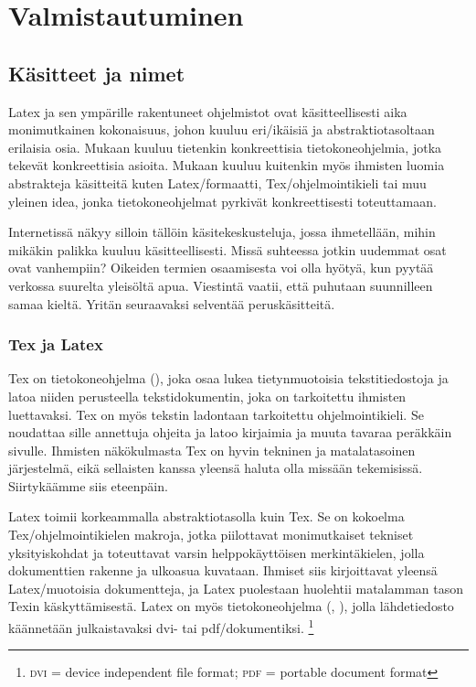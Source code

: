 
\chapter{Valmistautuminen}

\section{Käsitteet ja nimet}

Latex ja sen ympärille rakentuneet ohjelmistot ovat käsitteellisesti
aika monimutkainen kokonaisuus, johon kuuluu eri\-/ikäisiä ja
abstraktiotasoltaan erilaisia osia. Mukaan kuuluu tietenkin
konkreettisia tietokoneohjelmia, jotka tekevät konkreettisia asioita.
Mukaan kuuluu kuitenkin myös ihmisten luomia abstrakteja käsitteitä
kuten Latex\-/formaatti, Tex\-/ohjelmointikieli tai muu yleinen idea,
jonka tietokoneohjelmat pyrkivät konkreettisesti toteuttamaan.

Internetissä näkyy silloin tällöin käsitekeskusteluja, jossa
ihmetellään, mihin mikäkin palikka kuuluu käsitteellisesti. Missä
suhteessa jotkin uudemmat osat ovat vanhempiin? Oikeiden termien
osaamisesta voi olla hyötyä, kun pyytää verkossa suurelta yleisöltä
apua. Viestintä vaatii, että puhutaan suunnilleen samaa kieltä. Yritän
seuraavaksi selventää peruskäsitteitä.

\subsection{Tex ja Latex}

Tex on tietokoneohjelma (), joka osaa lukea tietynmuotoisia
tekstitiedostoja ja latoa niiden perusteella tekstidokumentin, joka on
tarkoitettu ihmisten luettavaksi. Tex on myös tekstin ladontaan
tarkoitettu ohjelmointikieli. Se noudattaa sille annettuja ohjeita ja
latoo kirjaimia ja muuta tavaraa peräkkäin sivulle. Ihmisten
näkökulmasta Tex on hyvin tekninen ja matalatasoinen järjestelmä, eikä
sellaisten kanssa yleensä haluta olla missään tekemisissä. Siirtykäämme
siis eteenpäin.

Latex toimii korkeammalla abstraktiotasolla kuin Tex. Se on kokoelma
Tex\-/ohjelmointikielen makroja, jotka piilottavat monimutkaiset
tekniset yksityiskohdat ja toteuttavat varsin helppokäyttöisen
merkintäkielen, jolla dokumenttien rakenne ja ulkoasua kuvataan. Ihmiset
siis kirjoittavat yleensä Latex\-/muotoisia dokumentteja, ja Latex
puolestaan huolehtii matalamman tason Texin käskyttämisestä. Latex on
myös tietokoneohjelma (, ), jolla
lähdetiedosto käännetään julkaistavaksi dvi- tai pdf\-/dokumentiksi.%
\footnote{\textsc{dvi} = device independent file format; \textsc{pdf} =
  portable document format}

